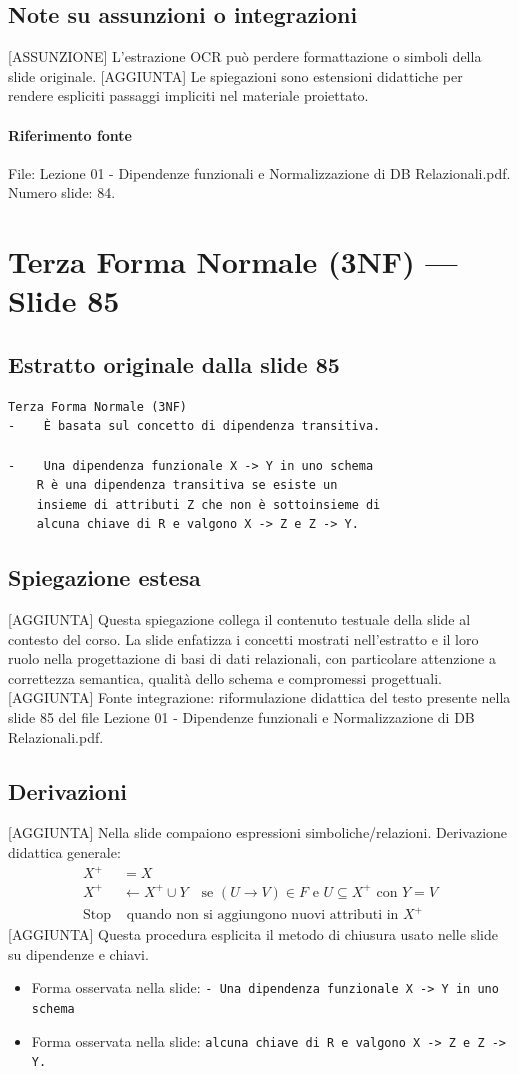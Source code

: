 \documentclass[11pt]{article}
\begin{document}
\subsection*{Note su assunzioni o integrazioni}
[ASSUNZIONE] L'estrazione OCR può perdere formattazione o simboli della slide originale.
[AGGIUNTA] Le spiegazioni sono estensioni didattiche per rendere espliciti passaggi impliciti nel materiale proiettato.
\paragraph{Riferimento fonte} File: Lezione 01 - Dipendenze funzionali e Normalizzazione di DB Relazionali.pdf. Numero slide: 84.
\section{Terza Forma Normale (3NF) --- Slide 85}
\subsection*{Estratto originale dalla slide 85}
\begin{lstlisting}
Terza Forma Normale (3NF)
-    È basata sul concetto di dipendenza transitiva.

-    Una dipendenza funzionale X -> Y in uno schema
    R è una dipendenza transitiva se esiste un
    insieme di attributi Z che non è sottoinsieme di
    alcuna chiave di R e valgono X -> Z e Z -> Y.
\end{lstlisting}
\subsection*{Spiegazione estesa}
[AGGIUNTA] Questa spiegazione collega il contenuto testuale della slide al contesto del corso. La slide enfatizza i concetti mostrati nell'estratto e il loro ruolo nella progettazione di basi di dati relazionali, con particolare attenzione a correttezza semantica, qualità dello schema e compromessi progettuali.
[AGGIUNTA] Fonte integrazione: riformulazione didattica del testo presente nella slide 85 del file Lezione 01 - Dipendenze funzionali e Normalizzazione di DB Relazionali.pdf.
\subsection*{Derivazioni}
[AGGIUNTA] Nella slide compaiono espressioni simboliche/relazioni. Derivazione didattica generale:
\begin{align*}
X^+ &= X \\
X^+ &\leftarrow X^+ \cup Y \quad \text{se } (U \to V) \in F \text{ e } U \subseteq X^+ \text{ con } Y=V \\
\text{Stop} &\text{ quando non si aggiungono nuovi attributi in } X^+
\end{align*}
[AGGIUNTA] Questa procedura esplicita il metodo di chiusura usato nelle slide su dipendenze e chiavi.
\begin{itemize}[leftmargin=*]
\item Forma osservata nella slide: \texttt{-    Una dipendenza funzionale X -> Y in uno schema}
\item Forma osservata nella slide: \texttt{alcuna chiave di R e valgono X -> Z e Z -> Y.}
\end{itemize}
\end{document}
